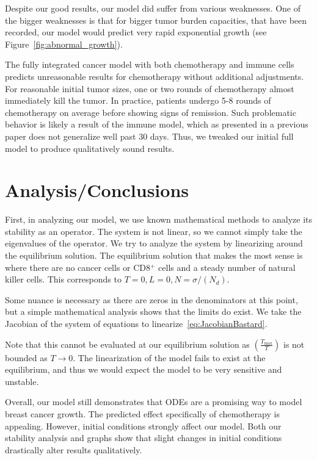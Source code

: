 \documentclass[11pt]{amsart}
\begin{document}
Despite our good results, our model did suffer from various weaknesses.
One of the bigger weaknesses is that for bigger tumor burden capacities, that have been recorded, our model would predict very rapid exponential growth (see Figure~\ref{fig:abnormal_growth}).

The fully integrated cancer model with both chemotherapy and immune cells predicts unreasonable results for chemotherapy without additional adjustments. For reasonable initial tumor sizes, one or two rounds of chemotherapy almost immediately kill the tumor. In practice, patients undergo 5-8 rounds of chemotherapy on average before showing signs of remission. Such problematic behavior is likely a result of the immune model, which as presented in a previous paper does not generalize well past 30 days. Thus, we tweaked our initial full model to produce qualitatively sound results.


\section{Analysis/Conclusions}

First, in analyzing our model, we use known mathematical methods to analyze its stability as an operator.
The system is not linear, so we cannot simply take the eigenvalues of the operator. 
We try to analyze the system by linearizing around the equilibrium solution. 
The equilibrium solution that makes the most sense is where there are no cancer cells or CD8$^+$ cells and a steady number of natural killer cells. 
This corresponds to $T=0, L=0, N=\sigma/(N_d)$.   

Some nuance is necessary as there are zeros in the denominators at this point, but a simple mathematical analysis shows that the limits do exist. 
We take the Jacobian of the system of equations to linearize\ \eqref{eq:JacobianBastard}. 

Note that this cannot be evaluated at our equilibrium solution as $\left(\frac{T_{\max}}{T}\right)$ is not bounded as $T \rightarrow 0$. 
The linearization of the model fails to exist at the equilibrium, and thus we would expect the model to be very sensitive and unstable.

Overall, our model still demonstrates that ODEs are a promising way to model breast cancer growth. 
The predicted effect specifically of chemotherapy is appealing. 
However, initial conditions strongly affect our model.
Both our stability analysis and graphs show that slight changes in initial conditions drastically alter results qualitatively.
\end{document}
